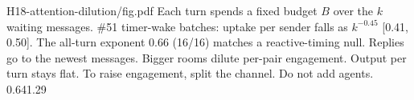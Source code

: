 {H18-attention-dilution/fig.pdf}
{Each turn spends a fixed budget $B$ over the $k$ waiting messages.}
{\#51 timer-wake batches: uptake per sender falls as $k^{-0.45}$ [0.41, 0.50]. The all-turn exponent 0.66 (16/16) matches a reactive-timing null. Replies go to the newest messages.}
{Bigger rooms dilute per-pair engagement. Output per turn stays flat. To raise engagement, split the channel. Do not add agents.}
{0.64}{1.29}
